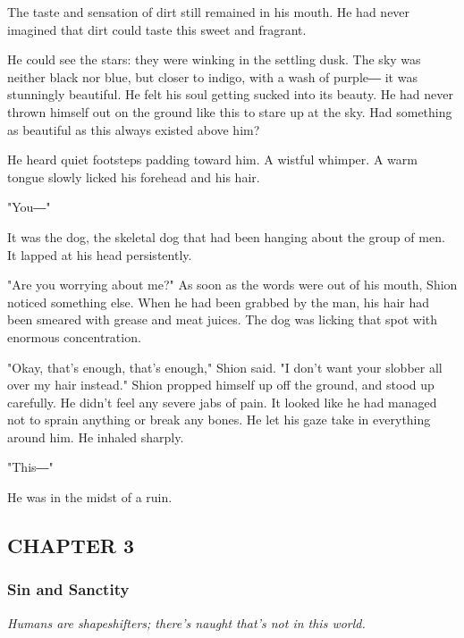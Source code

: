 The taste and sensation of dirt still remained in his mouth. He had
never imagined that dirt could taste this sweet and fragrant.

He could see the stars: they were winking in the settling dusk. The sky
was neither black nor blue, but closer to indigo, with a wash of purple―
it was stunningly beautiful. He felt his soul getting sucked into its
beauty. He had never thrown himself out on the ground like this to stare
up at the sky. Had something as beautiful as this always existed above
him?

He heard quiet footsteps padding toward him. A wistful whimper. A warm
tongue slowly licked his forehead and his hair.

"You―"

It was the dog, the skeletal dog that had been hanging about the group
of men. It lapped at his head persistently.

"Are you worrying about me?" As soon as the words were out of his mouth,
Shion noticed something else. When he had been grabbed by the man, his
hair had been smeared with grease and meat juices. The dog was licking
that spot with enormous concentration.

"Okay, that's enough, that's enough," Shion said. "I don't want your
slobber all over my hair instead." Shion propped himself up off the
ground, and stood up carefully. He didn't feel any severe jabs of pain.
It looked like he had managed not to sprain anything or break any bones.
He let his gaze take in everything around him. He inhaled sharply.

"This―"

He was in the midst of a ruin.

\hypertarget{index_split_021.htmlux5cux23calibre_pb_47}{}

\protect\hypertarget{index_split_046.html}{}{}

\hypertarget{index_split_046.htmlux5cux23calibre_pb_0}{}

\hypertarget{index_split_046.htmlux5cux23calibre_toc_4}{%
\subsection{CHAPTER 3}\label{index_split_046.htmlux5cux23calibre_toc_4}}

\subsubsection{Sin and Sanctity}

\emph{Humans are shapeshifters; there's naught that's not in this
world.~}

